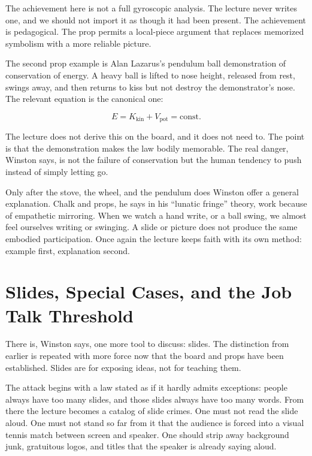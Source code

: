 The achievement here is not a full gyroscopic analysis. The lecture never writes one, and we should not import it as though it had been present. The achievement is pedagogical. The prop permits a local-piece argument that replaces memorized symbolism with a more reliable picture.

The second prop example is Alan Lazarus's pendulum ball demonstration of conservation of energy. A heavy ball is lifted to nose height, released from rest, swings away, and then returns to kiss but not destroy the demonstrator's nose. The relevant equation is the canonical one:

\begin{equation}
E = K_{\mathrm{kin}} + V_{\mathrm{pot}} = \text{const.}
\end{equation}

The lecture does not derive this on the board, and it does not need to. The point is that the demonstration makes the law bodily memorable. The real danger, Winston says, is not the failure of conservation but the human tendency to push instead of simply letting go.

Only after the stove, the wheel, and the pendulum does Winston offer a general explanation. Chalk and props, he says in his ``lunatic fringe'' theory, work because of empathetic mirroring. When we watch a hand write, or a ball swing, we almost feel ourselves writing or swinging. A slide or picture does not produce the same embodied participation. Once again the lecture keeps faith with its own method: example first, explanation second.

\section{Slides, Special Cases, and the Job Talk Threshold}

There is, Winston says, one more tool to discuss: slides. The distinction from earlier is repeated with more force now that the board and props have been established. Slides are for exposing ideas, not for teaching them.

The attack begins with a law stated as if it hardly admits exceptions: people always have too many slides, and those slides always have too many words. From there the lecture becomes a catalog of slide crimes. One must not read the slide aloud. One must not stand so far from it that the audience is forced into a visual tennis match between screen and speaker. One should strip away background junk, gratuitous logos, and titles that the speaker is already saying aloud.

